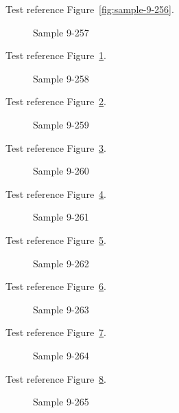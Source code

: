 Test reference Figure~\ref{fig:sample-9-256}.

\begin{figure}[tbhp]
\caption{Sample 9-257}
\label{fig:sample-9-257}
\end{figure}

Test reference Figure~\ref{fig:sample-9-257}.

\begin{figure}[tbhp]
\caption{Sample 9-258}
\label{fig:sample-9-258}
\end{figure}

Test reference Figure~\ref{fig:sample-9-258}.

\begin{figure}[tbhp]
\caption{Sample 9-259}
\label{fig:sample-9-259}
\end{figure}

Test reference Figure~\ref{fig:sample-9-259}.

\begin{figure}[tbhp]
\caption{Sample 9-260}
\label{fig:sample-9-260}
\end{figure}

Test reference Figure~\ref{fig:sample-9-260}.

\begin{figure}[tbhp]
\caption{Sample 9-261}
\label{fig:sample-9-261}
\end{figure}

Test reference Figure~\ref{fig:sample-9-261}.

\begin{figure}[tbhp]
\caption{Sample 9-262}
\label{fig:sample-9-262}
\end{figure}

Test reference Figure~\ref{fig:sample-9-262}.

\begin{figure}[tbhp]
\caption{Sample 9-263}
\label{fig:sample-9-263}
\end{figure}

Test reference Figure~\ref{fig:sample-9-263}.

\begin{figure}[tbhp]
\caption{Sample 9-264}
\label{fig:sample-9-264}
\end{figure}

Test reference Figure~\ref{fig:sample-9-264}.

\begin{figure}[tbhp]
\caption{Sample 9-265}
\label{fig:sample-9-265}
\end{figure}

